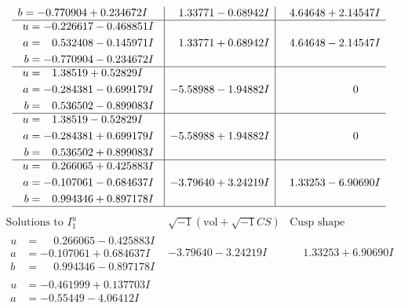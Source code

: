 \documentclass[1p]{elsarticle_modified}
\theoremstyle{definition}
\newcommand{\I}{\sqrt{-1}}
\begin{document}
$$\begin{array}{c|c|c}
\begin{aligned}
b &= -0.770904 + 0.234672 I\end{aligned}
 & \phantom{-}1.33771 - 0.68942 I & \phantom{-}4.64648 + 2.14547 I \\ \hline\begin{aligned}
u &= -0.226617 - 0.468851 I \\
a &= \phantom{-}0.532408 - 0.145971 I \\
b &= -0.770904 - 0.234672 I\end{aligned}
 & \phantom{-}1.33771 + 0.68942 I & \phantom{-}4.64648 - 2.14547 I \\ \hline\begin{aligned}
u &= \phantom{-}1.38519 + 0.52829 I \\
a &= -0.284381 - 0.699179 I \\
b &= \phantom{-}0.536502 - 0.899083 I\end{aligned}
 & -5.58988 - 1.94882 I & \phantom{-0.000000 } 0 \\ \hline\begin{aligned}
u &= \phantom{-}1.38519 - 0.52829 I \\
a &= -0.284381 + 0.699179 I \\
b &= \phantom{-}0.536502 + 0.899083 I\end{aligned}
 & -5.58988 + 1.94882 I & \phantom{-0.000000 } 0 \\ \hline\begin{aligned}
u &= \phantom{-}0.266065 + 0.425883 I \\
a &= -0.107061 - 0.684637 I \\
b &= \phantom{-}0.994346 + 0.897178 I\end{aligned}
 & -3.79640 + 3.24219 I & \phantom{-}1.33253 - 6.90690 I\\
 \hline 
 \end{array}$$\newpage$$\begin{array}{c|c|c}  
\text{Solutions to }I^u_{1}& \I (\text{vol} + \sqrt{-1}CS) & \text{Cusp shape}\\
 \hline 
\begin{aligned}
u &= \phantom{-}0.266065 - 0.425883 I \\
a &= -0.107061 + 0.684637 I \\
b &= \phantom{-}0.994346 - 0.897178 I\end{aligned}
 & -3.79640 - 3.24219 I & \phantom{-}1.33253 + 6.90690 I \\ \hline\begin{aligned}
u &= -0.461999 + 0.137703 I \\
a &= -0.55449 - 4.06412 I \\

\end{aligned}
\end{array}$$
\end{document}
